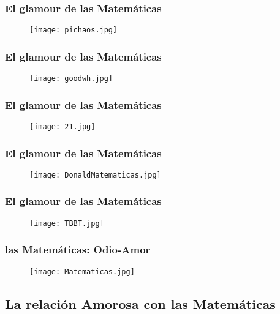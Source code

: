 \documentclass[xcolor=dvipsnames]{beamer}
\begin{document}
\begin{frame}\frametitle{El glamour de las Matem\'aticas}

\begin{figure}[H]
\centering
\texttt{[image: pichaos.jpg]}
\end{figure}
\end{frame}


\begin{frame}\frametitle{El glamour de las Matem\'aticas}

\begin{figure}[H]
\centering
\texttt{[image: goodwh.jpg]}
\end{figure}
\end{frame}


\begin{frame}\frametitle{El glamour de las Matem\'aticas}

\begin{figure}[H]
\centering
\texttt{[image: 21.jpg]}
\end{figure}
\end{frame}

\begin{frame}\frametitle{El glamour de las Matem\'aticas}

\begin{figure}[H]
\centering
\texttt{[image: DonaldMatematicas.jpg]}
\end{figure}
\end{frame}


\begin{frame}\frametitle{El glamour de las Matem\'aticas}

\begin{figure}[H]
\centering
\texttt{[image: TBBT.jpg]}
\end{figure}
\end{frame}

\begin{frame}\frametitle{las Matem\'aticas: Odio-Amor}
\pause
\begin{figure}[H]
\centering
\texttt{[image: Matematicas.jpg]}
\end{figure}
\end{frame}



\subsection{La relaci\'on Amorosa con las Matem\'aticas}
\end{document}
